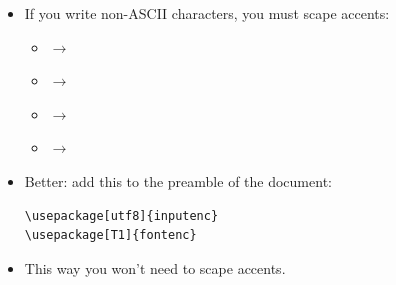 \documentclass{beamer}
\begin{document}
\begin{frame}[fragile]{\insertsubsection}
\begin{itemize}

\item If you write non-ASCII characters, you must scape accents:
\begin{itemize}
  \item {} $\to$ 
  \item {} $\to$ 
  \item {} $\to$ 
  \item {} $\to$ 
\end{itemize}

\item Better: add this to the preamble of the document:

\begin{verbatim}
\usepackage[utf8]{inputenc} 
\usepackage[T1]{fontenc}
\end{verbatim}

\item This way you won't need to scape accents.

\end{itemize}
\end{frame}
\end{document}
